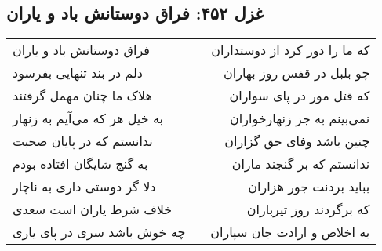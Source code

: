 \begin{center}
\section*{غزل ۴۵۲: فراق دوستانش باد و یاران}
\label{sec:452}
\begin{longtable}{l p{0.5cm} r}
فراق دوستانش باد و یاران
&&
که ما را دور کرد از دوستداران
\\
دلم در بند تنهایی بفرسود
&&
چو بلبل در قفس روز بهاران
\\
هلاک ما چنان مهمل گرفتند
&&
که قتل مور در پای سواران
\\
به خیل هر که می‌آیم به زنهار
&&
نمی‌بینم به جز زنهارخواران
\\
ندانستم که در پایان صحبت
&&
چنین باشد وفای حق گزاران
\\
به گنج شایگان افتاده بودم
&&
ندانستم که بر گنجند ماران
\\
دلا گر دوستی داری به ناچار
&&
بباید بردنت جور هزاران
\\
خلاف شرط یاران است سعدی
&&
که برگردند روز تیرباران
\\
چه خوش باشد سری در پای یاری
&&
به اخلاص و ارادت جان سپاران
\\
\end{longtable}
\end{center}
